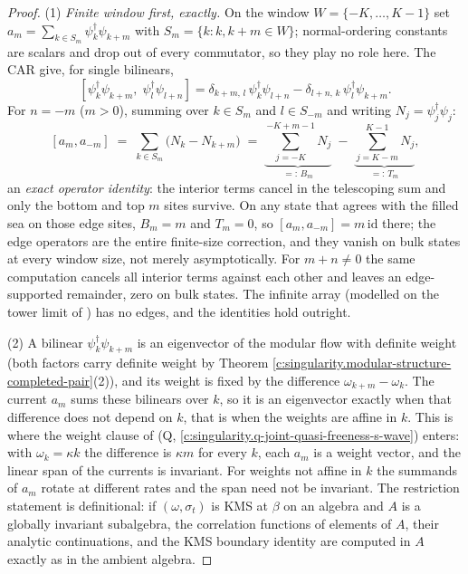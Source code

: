 \documentclass[11pt]{article}
\theoremstyle{definition}
\theoremstyle{plain}
\providecommand{\id}{}\renewcommand{\id}{\mathrm{id}}
\begin{document}
\begin{proof}
(1) \emph{Finite window first, exactly.} On the window $W = \{-K, \dots, K-1\}$ set $a_m = \sum_{k \in S_m} \psi^\dagger_k \psi_{k+m}$ with $S_m = \{k : k, k+m \in W\}$; normal-ordering constants are scalars and drop out of every commutator, so they play no role here. The CAR give, for single bilinears,
\[
[\psi^\dagger_k \psi_{k+m},\; \psi^\dagger_l \psi_{l+n}] = \delta_{k+m,\,l}\,\psi^\dagger_k\psi_{l+n} - \delta_{l+n,\,k}\,\psi^\dagger_l\psi_{k+m} .
\]
For $n = -m$ ($m > 0$), summing over $k \in S_m$ and $l \in S_{-m}$ and writing $N_j = \psi^\dagger_j\psi_j$:
\[
[a_m, a_{-m}] \;=\; \sum_{k \in S_m} \bigl(N_k - N_{k+m}\bigr)
\;=\; \underbrace{\sum_{j=-K}^{-K+m-1} N_j}_{=:\,B_m} \;-\; \underbrace{\sum_{j=K-m}^{K-1} N_j}_{=:\,T_m} ,
\]
an \emph{exact operator identity}: the interior terms cancel in the telescoping sum and only the bottom and top $m$ sites survive. On any state that agrees with the filled sea on those edge sites, $B_m = m$ and $T_m = 0$, so $[a_m, a_{-m}] = m\,\id$ there; the edge operators are the entire finite-size correction, and they vanish on bulk states at every window size, not merely asymptotically. For $m + n \neq 0$ the same computation cancels all interior terms against each other and leaves an edge-supported remainder, zero on bulk states. The infinite array (modelled on the tower limit of \cite[Thm.~5.6]{ButlerT3}) has no edges, and the identities hold outright.

(2) A bilinear $\psi^\dagger_k\psi_{k+m}$ is an eigenvector of the modular flow with definite weight (both factors carry definite weight by Theorem \ref{c:singularity.modular-structure-completed-pair}(2)), and its weight is fixed by the difference $\omega_{k+m} - \omega_k$. The current $a_m$ sums these bilinears over $k$, so it is an eigenvector exactly when that difference does not depend on $k$, that is when the weights are affine in $k$. This is where the weight clause of (Q, \ref{c:singularity.q-joint-quasi-freeness-s-wave}) enters: with $\omega_k = \kappa k$ the difference is $\kappa m$ for every $k$, each $a_m$ is a weight vector, and the linear span of the currents is invariant. For weights not affine in $k$ the summands of $a_m$ rotate at different rates and the span need not be invariant. The restriction statement is definitional: if $(\omega, \sigma_t)$ is KMS at $\beta$ on an algebra and $A$ is a globally invariant subalgebra, the correlation functions of elements of $A$, their analytic continuations, and the KMS boundary identity are computed in $A$ exactly as in the ambient algebra.


\end{proof}
\end{document}
